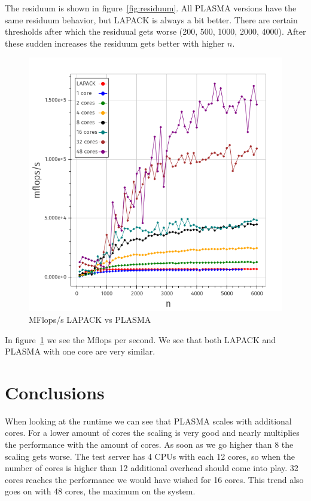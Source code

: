 \documentclass[a4paper,final,ngerman,english]{article}
\begin{document}
The residuum is shown in figure~\ref{fig:residuum}.
All PLASMA versions have the same residuum behavior, but LAPACK is always a bit better.  
There are certain thresholds after which the residuual gets worse (200, 500, 1000, 2000, 4000).
After these sudden increases the residuum gets better with higher $n$.

\begin{figure}[h!]
	\centering
	\includegraphics[width=\textwidth]{mflops}
	\caption{MFlops/s LAPACK vs PLASMA} 
\label{fig:mflops}
\end{figure}

In figure~\ref{fig:mflops} we see the Mflops per second.
We see that both LAPACK and PLASMA with one core are very similar. 

\section{Conclusions}
When looking at the runtime we can see that PLASMA scales with additional cores. 
For a lower amount of cores the scaling is very good and nearly multiplies the performance with the amount of cores.
As soon as we go higher than 8 the scaling gets worse.
The test server has 4 CPUs with each 12 cores, so when the number of cores is higher than 12 additional
overhead should come into play.
32 cores reaches the performance we would have wished for 16 cores.
This trend also goes on with 48 cores, the maximum on the system. 
\end{document}
